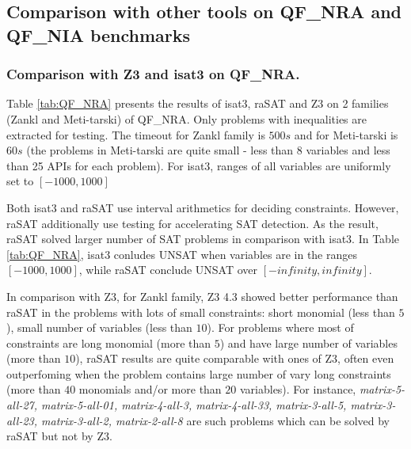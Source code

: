 \documentclass[runningheads,a4paper,oribibl]{llncs}
\begin{document}
\begin{table}[t]
\centering
{}
    \medskip
   	\caption{Experiments of strategies on Zankl family}
   	\label{tab:strategies-zankl}
\end{table}

\subsection {Comparison with other tools on QF\_NRA and QF\_NIA benchmarks} 
\label{sec:comparisons}
\subsubsection{Comparison with Z3 and isat3 on QF\_NRA.}
Table \ref{tab:QF_NRA} presents the results of isat3, raSAT and Z3 on 2 families (Zankl and Meti-tarski) of QF\_NRA. Only problems with inequalities are extracted for testing. The timeout for Zankl family is $500s$ and for Meti-tarski is $60s$ (the problems in Meti-tarski are quite small - less than 8 variables and less than 25 APIs for each problem). For isat3, ranges of all variables are uniformly set to $[-1000, 1000]$

Both isat3 and raSAT use interval arithmetics for deciding constraints. However, raSAT additionally use testing for accelerating SAT detection. As the result, raSAT solved larger number of SAT problems in comparison with isat3. In Table \ref{tab:QF_NRA}, isat3 conludes UNSAT when variables are in the ranges $[-1000, 1000]$, while raSAT conclude UNSAT over $[-infinity, infinity]$.


In comparison with Z3, for Zankl family, Z3 4.3 showed better performance than raSAT in the problems with lots of small constraints: short monomial (less than $5$), small number of variables (less than $10$). For problems where most of constraints are long monomial (more than $5$) and have large number of variables (more than $10$), raSAT results are quite comparable with ones of Z3, often even outperfoming when the problem contains large number of vary long constraints (more than $40$ monomials and/or more than $20$ variables). For instance, \textit{matrix-5-all-27, matrix-5-all-01, matrix-4-all-3, matrix-4-all-33, matrix-3-all-5, matrix-3-all-23, matrix-3-all-2, matrix-2-all-8} are such problems which can be solved by raSAT but not by Z3.
\end{document}
